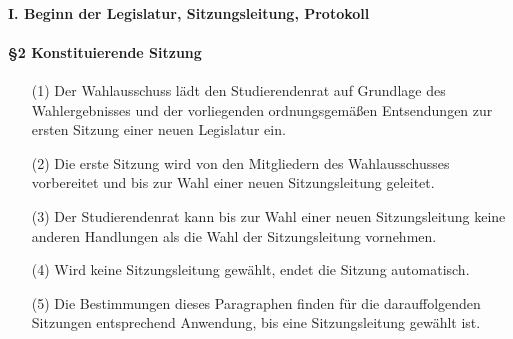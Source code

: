     \paragraph{I. Beginn der Legislatur, Sitzungsleitung, Protokoll}
        \paragraph{§2 Konstituierende Sitzung}
            \begin{itemize}
                \item[(1)] Der Wahlausschuss lädt den Studierendenrat auf Grundlage des Wahlergebnisses und der vorliegenden ordnungsgemäßen Entsendungen zur ersten Sitzung einer neuen Legislatur ein.
                \item[(2)] Die erste Sitzung wird von den Mitgliedern des Wahlausschusses vorbereitet und bis zur Wahl einer neuen Sitzungsleitung geleitet.
                \item[(3)] Der Studierendenrat kann bis zur Wahl einer neuen Sitzungsleitung keine anderen Handlungen als die Wahl der Sitzungsleitung vornehmen. 
                \item[(4)] Wird keine Sitzungsleitung gewählt, endet die Sitzung automatisch.
                \item[(5)] Die Bestimmungen dieses Paragraphen finden für die darauffolgenden Sitzungen entsprechend Anwendung, bis eine Sitzungsleitung gewählt ist.    
            \end{itemize}
